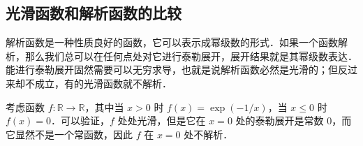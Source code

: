 \subsection{光滑函数和解析函数的比较}

解析函数是一种性质良好的函数，它可以表示成幂级数的形式．如果一个函数解析，那么我们总可以在任何点处对它进行泰勒展开，展开结果就是其幂级数表达．能进行泰勒展开固然需要可以无穷求导，也就是说解析函数必然是光滑的；但反过来却不成立，有的光滑函数就不解析．

\begin{example}{}\label{SmthM_ex1}
考虑函数 $f:\mathbb{R}\rightarrow\mathbb{R}$，其中当 $x>0$ 时 $f(x)=\exp{(-1/x)}$，当 $x\leq 0$ 时 $f(x)=0$．可以验证，$f$ 处处光滑，但是它在 $x=0$ 处的泰勒展开是常数 $0$，而它显然不是一个常函数，因此 $f$ 在 $x=0$ 处不解析．
\end{example}



